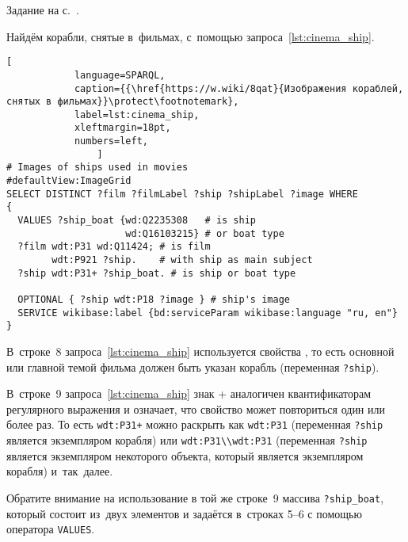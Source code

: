 \begin{task}
    \label{answer:ship_book}
    \AnswerBackref Задание на с.~\pageref{question:ship_book}.

    Найдём корабли, снятые в~фильмах, с~помощью запроса~\ref{lst:cinema_ship}. 

\begin{lstlisting}[ 
            language=SPARQL, 
            caption={{\href{https://w.wiki/8qat}{Изображения кораблей, снятых в фильмах}}\protect\footnotemark}, 
            label=lst:cinema_ship, 
            xleftmargin=18pt, 
            numbers=left,
                ]
# Images of ships used in movies
#defaultView:ImageGrid
SELECT DISTINCT ?film ?filmLabel ?ship ?shipLabel ?image WHERE
{
  VALUES ?ship_boat {wd:Q2235308   # is ship
                     wd:Q16103215} # or boat type
  ?film wdt:P31 wd:Q11424; # is film	
        wdt:P921 ?ship.    # with ship as main subject
  ?ship wdt:P31+ ?ship_boat. # is ship or boat type
    
  OPTIONAL { ?ship wdt:P18 ?image } # ship's image
  SERVICE wikibase:label {bd:serviceParam wikibase:language "ru, en"}
}
\end{lstlisting}

    В~строке~8 запроса~\ref{lst:cinema_ship} используется свойства , 
    то есть основной или главной темой фильма должен быть указан корабль 
    (переменная \lstinline|?ship|). 

    \newpage
    В~строке~9 запроса~\ref{lst:cinema_ship} знак + 
    аналогичен квантификаторам регулярного выражения и означает, 
    что свойство  может повториться один или более раз. 
    То есть \lstinline|wdt:P31+| можно раскрыть как \lstinline|wdt:P31| (переменная \lstinline|?ship| является экземпляром корабля) 
    или \mbox{\lstinline|wdt:P31\\wdt:P31|} (переменная \lstinline|?ship| является экземпляром некоторого объекта, который является экземпляром корабля) 
    и~так~далее. 


    Обратите внимание на использование в той же строке~9 массива \lstinline|?ship_boat|, 
    который состоит из~двух элементов и задаётся в~строках 5--6 
    с помощью оператора \lstinline|VALUES|.



\end{task}
